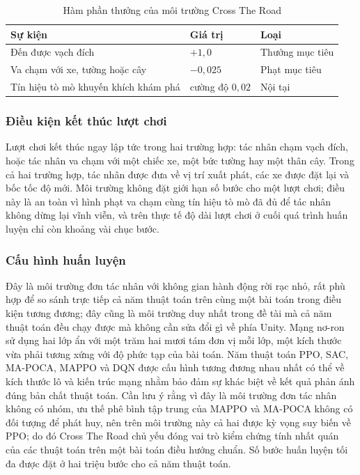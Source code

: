 \begin{table}[H]
\centering
\caption{Hàm phần thưởng của môi trường Cross The Road}
\label{tab:reward_crossroad}
\renewcommand{\arraystretch}{1.4}
\tablefont
\begin{tabular}{|p{6.5cm}|>{\centering\arraybackslash}p{3cm}|p{3.5cm}|}
\hline
\textbf{Sự kiện} & \textbf{Giá trị} & \textbf{Loại} \\
\hline
Đến được vạch đích & $+1{,}0$ & Thưởng mục tiêu \\
\hline
Va chạm với xe, tường hoặc cây & $-0{,}025$ & Phạt mục tiêu \\
\hline
Tín hiệu tò mò khuyến khích khám phá & cường độ $0{,}02$ & Nội tại \\
\hline
\end{tabular}
\end{table}

\subsubsection{Điều kiện kết thúc lượt chơi}
\indent Lượt chơi kết thúc ngay lập tức trong hai trường hợp: tác nhân chạm vạch đích,
hoặc tác nhân va chạm với một chiếc xe, một bức tường hay một thân cây. Trong cả hai
trường hợp, tác nhân được đưa về vị trí xuất phát, các xe được đặt lại và bốc tốc độ
mới. Môi trường không đặt giới hạn số bước cho một lượt chơi; điều này là an toàn vì
hình phạt va chạm cùng tín hiệu tò mò đã đủ để tác nhân không dừng lại vĩnh viễn, và
trên thực tế độ dài lượt chơi ở cuối quá trình huấn luyện chỉ còn khoảng vài chục bước.

\subsubsection{Cấu hình huấn luyện}
\indent Đây là môi trường đơn tác nhân với không gian hành động rời rạc nhỏ, rất phù
hợp để so sánh trực tiếp cả năm thuật toán trên cùng một bài toán trong điều kiện tương
đương; đây cũng là môi trường duy nhất trong đề tài mà cả năm thuật toán đều chạy được
mà không cần sửa đổi gì về phía Unity. Mạng nơ-ron sử dụng hai lớp ẩn với một trăm hai
mươi tám đơn vị mỗi lớp, một
kích thước vừa phải tương xứng với độ phức tạp của bài toán. Năm thuật toán PPO, SAC,
MA-POCA, MAPPO và DQN được cấu hình tương đương nhau nhất có thể về kích thước lô và
kiến trúc mạng nhằm bảo đảm sự khác biệt về kết quả phản ánh đúng bản chất thuật toán.
Cần lưu ý rằng vì đây là môi trường đơn tác nhân không có nhóm, ưu thế phê bình tập
trung của MAPPO và MA-POCA không có đối tượng để phát huy, nên trên môi trường này cả
hai được kỳ vọng suy biến về PPO; do đó Cross The Road chủ yếu đóng vai trò kiểm chứng
tính nhất quán của các thuật toán trên một bài toán điều hướng chuẩn. Số bước huấn
luyện tối đa được đặt ở hai triệu bước cho cả năm thuật toán.

